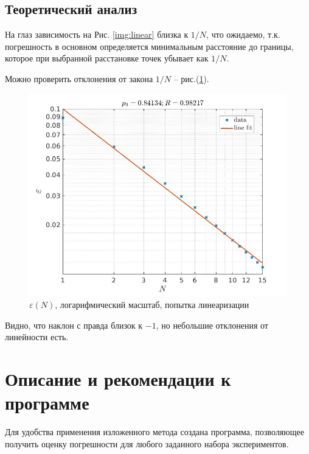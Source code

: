 \documentclass[a4paper,12pt]{article} %
\begin{document}
\newpage

\subsection{Теоретический анализ}

На глаз зависимость на Рис. \ref{img:linear} близка к $1/N$, что ожидаемо, т.к. погрешность в основном определяется минимальным расстояние до границы, которое при выбранной расстановке точек убывает как $1/N$. 

Можно проверить отклонения от закона $1/N$ -- рис.(\ref{img:log}).

\begin{figure}[h!]
\begin{center}
\includegraphics[width=1\textwidth]{./pics/log}
\end{center}
\caption{$\varepsilon(N)$, логарифмический масштаб, попытка линеаризации} \label{img:log}
\end{figure}

Видно, что наклон с правда близок к $-1$, но небольшие отклонения от линейности есть.

\newpage

\section{Описание и рекомендации к программе}

Для удобства применения изложенного метода создана программа, позволяющее получить оценку погрешности для любого заданного набора экспериментов.
\end{document}

